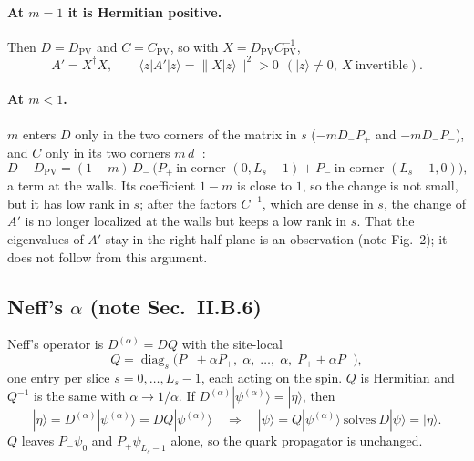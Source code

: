 \documentclass[11pt,a4paper]{article}
\numberwithin{equation}{section}
\newcommand{\dg}{^{\dagger}}
\newcommand{\Dpv}{D_{\mathrm{PV}}}
\newcommand{\Cpv}{C_{\mathrm{PV}}}
\newcommand{\Pp}{P_{+}}
\newcommand{\Pm}{P_{-}}
\begin{document}
\paragraph{At $m=1$ it is Hermitian positive.} Then $D=\Dpv$ and $C=\Cpv$, so with
$X=\Dpv\Cpv^{-1}$,
\begin{equation}
A'=X\dg X,\qquad \langle z|A'|z\rangle=\big\|X|z\rangle\big\|^2>0\ \ (|z\rangle\neq0,\ X\ \text{invertible}).
\end{equation}
\paragraph{At $m<1$.} $m$ enters $D$ only in the two corners of the matrix in $s$ ($-mD_-\Pp$
and $-mD_-\Pm$), and $C$ only in its two corners $m\,d_-$:
\begin{equation}
D-\Dpv=(1-m)\,D_-\,\big(\Pp\ \text{in corner }(0,L_s-1)+\Pm\ \text{in corner }(L_s-1,0)\big),
\end{equation}
a term at the walls. Its coefficient $1-m$ is close to $1$, so the change is not small, but it
has low rank in $s$; after the factors $C^{-1}$, which are dense in $s$, the change of $A'$ is no
longer localized at the walls but keeps a low rank in $s$. That the eigenvalues of $A'$ stay in
the right half-plane is an observation (note Fig.~2); it does not follow from this argument.

\subsection{Neff's $\alpha$ (note Sec.~II.B.6)}
\label{sec:neff}
Neff's operator is $D^{(\alpha)}=DQ$ with the site-local
\begin{equation}
Q=\operatorname{diag}_s\big(\Pm+\alpha\Pp,\;\alpha,\;\dots,\;\alpha,\;\Pp+\alpha\Pm\big),
\end{equation}
one entry per slice $s=0,\dots,L_s-1$, each acting on the spin.
$Q$ is Hermitian and $Q^{-1}$ is the same with $\alpha\to1/\alpha$. If $D^{(\alpha)}|\psi^{(\alpha)}\rangle=|\eta\rangle$, then
\begin{equation}
|\eta\rangle=D^{(\alpha)}|\psi^{(\alpha)}\rangle=DQ|\psi^{(\alpha)}\rangle\quad\Longrightarrow\quad|\psi\rangle=Q|\psi^{(\alpha)}\rangle
\ \text{solves}\ D|\psi\rangle=|\eta\rangle .
\end{equation}
$Q$ leaves $\Pm\psi_0$ and $\Pp\psi_{L_s-1}$ alone, so the quark propagator is unchanged.


\end{document}

